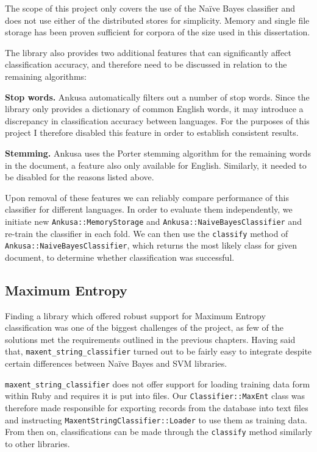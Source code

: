The scope of this project only covers the use of the Na\"ive Bayes classifier and does not use either of the distributed stores for simplicity. Memory and single file storage has been proven sufficient for corpora of the size used in this dissertation.

The library also provides two additional features that can significantly affect classification accuracy, and therefore need to be discussed in relation to the remaining algorithms:

\textbf{Stop words.} Ankusa automatically filters out a number of stop words. Since the library only provides a dictionary of common English words, it may introduce a discrepancy in classification accuracy between languages. For the purposes of this project I therefore disabled this feature in order to establish consistent results.

\textbf{Stemming.} Ankusa uses the Porter stemming algorithm for the remaining words in the document, a feature also only available for English. Similarly, it needed to be disabled for the reasons listed above.

Upon removal of these features we can reliably compare performance of this classifier for different languages. In order to evaluate them independently, we initiate new \verb|Ankusa::MemoryStorage| and \verb|Ankusa::NaiveBayesClassifier| and re-train the classifier in each fold. We can then use the \verb|classify| method of \verb|Ankusa::NaiveBayesClassifier|, which returns the most likely class for given document, to determine whether classification was successful.

\subsection{Maximum Entropy}

Finding a library which offered robust support for Maximum Entropy classification was one of the biggest challenges of the project, as few of the solutions met the requirements outlined in the previous chapters. Having said that, \verb|maxent_string_classifier| turned out to be fairly easy to integrate despite certain differences between Na\"ive Bayes and SVM libraries.

\verb|maxent_string_classifier| does not offer support for loading training data form within Ruby and requires it is put into files. Our \verb|Classifier::MaxEnt| class was therefore made responsible for exporting records from the database into text files and instructing \verb|MaxentStringClassifier::Loader| to use them as training data. From then on, classifications can be made through the \verb|classify| method similarly to other libraries.

